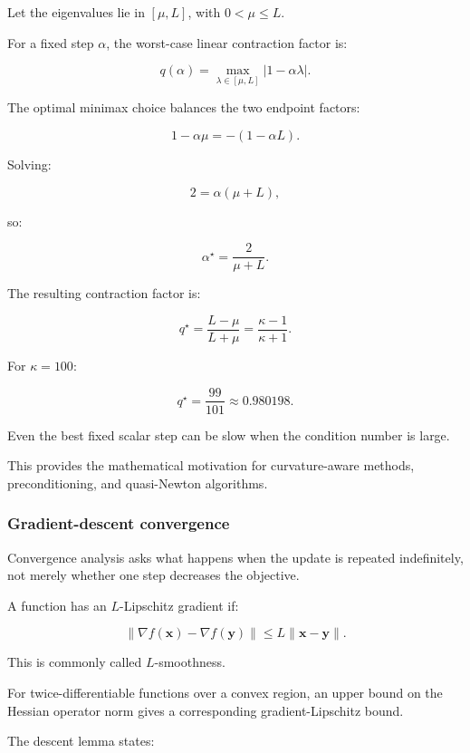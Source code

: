 \hypertarget{02-foundations-ii-ch026-exact-best-constant-step-for-a-strongly-convex-quadratic}{}

Let the eigenvalues lie in \([\mu,L]\), with \(0<\mu\le L\).

For a fixed step \(\alpha\), the worst-case linear contraction factor is:

\[
q(\alpha)= \max_{\lambda\in[\mu,L]} |1-\alpha\lambda|.
\]

The optimal minimax choice balances the two endpoint factors:

\[
1-\alpha\mu=-(1-\alpha L).
\]

Solving:

\[
2=\alpha(\mu+L),
\]

so:

\[
\boxed{ \alpha^\star=\frac2{\mu+L} }.
\]

The resulting contraction factor is:

\[
\boxed{ q^\star=\frac{L-\mu}{L+\mu} =\frac{\kappa-1}{\kappa+1} }.
\]

For \(\kappa=100\):

\[
q^\star=\frac{99}{101}\approx0.980198.
\]

Even the best fixed scalar step can be slow when the condition number is large.

This provides the mathematical motivation for curvature-aware methods, preconditioning, and quasi-Newton algorithms.

\subsubsection{Gradient-descent convergence}\label{02-foundations-ii-ch026-gradient-descent-convergence}

\hypertarget{02-foundations-ii-ch026-gradient-descent-convergence}{}

Convergence analysis asks what happens when the update is repeated indefinitely, not merely whether one step decreases the objective.

A function has an \(L\)-Lipschitz gradient if:

\[
\|\nabla f(\mathbf x)-\nabla f(\mathbf y)\| \le L\|\mathbf x-\mathbf y\|.
\]

This is commonly called \(L\)-smoothness.

For twice-differentiable functions over a convex region, an upper bound on the Hessian operator norm gives a corresponding gradient-Lipschitz bound.

The descent lemma states:

